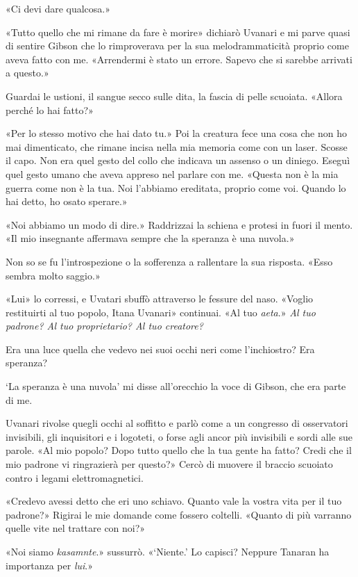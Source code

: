 «Ci devi dare qualcosa.»

«Tutto quello che mi rimane da fare è morire» dichiarò Uvanari e mi
parve quasi di sentire Gibson che lo rimproverava per la sua
melodrammaticità proprio come aveva fatto con me. «Arrendermi è stato un
errore. Sapevo che si sarebbe arrivati a questo.»

Guardai le ustioni, il sangue secco sulle dita, la fascia di pelle
scuoiata. «Allora perché lo hai fatto?»

«Per lo stesso motivo che hai dato tu.» Poi la creatura fece una cosa
che non ho mai dimenticato, che rimane incisa nella mia memoria come con
un laser. Scosse il capo. Non era quel gesto del collo che indicava un
assenso o un diniego. Eseguì quel gesto umano che aveva appreso nel
parlare con me. «Questa non è la mia guerra come non è la tua. Noi
l'abbiamo ereditata, proprio come voi. Quando lo hai detto, ho osato
sperare.»

«Noi abbiamo un modo di dire.» Raddrizzai la schiena e protesi in fuori
il mento. «Il mio insegnante affermava sempre che la speranza è una
nuvola.»

Non so se fu l'introspezione o la sofferenza a rallentare la sua
risposta. «Esso sembra molto saggio.»

«Lui» lo corressi, e Uvatari sbuffò attraverso le fessure del naso.
«Voglio restituirti al tuo popolo, Itana Uvanari» continuai. «Al tuo
\emph{aeta}.» \emph{Al tuo padrone? Al tuo proprietario? Al tuo
	creatore?}

Era una luce quella che vedevo nei suoi occhi neri come l'inchiostro?
Era speranza?

`La speranza è una nuvola' mi disse all'orecchio la voce di Gibson, che
era parte di me.

Uvanari rivolse quegli occhi al soffitto e parlò come a un congresso di
osservatori invisibili, gli inquisitori e i logoteti, o forse agli ancor
più invisibili e sordi alle sue parole. «Al mio popolo? Dopo tutto
quello che la tua gente ha fatto? Credi che il mio padrone vi
ringrazierà per questo?» Cercò di muovere il braccio scuoiato contro i
legami elettromagnetici.

«Credevo avessi detto che eri uno schiavo. Quanto vale la vostra vita
per il tuo padrone?» Rigirai le mie domande come fossero coltelli.
«Quanto di più varranno quelle vite nel trattare con noi?»

«Noi siamo \emph{kasamnte}.» sussurrò. «`Niente.' Lo capisci? Neppure
Tanaran ha importanza per \emph{lui}.»

